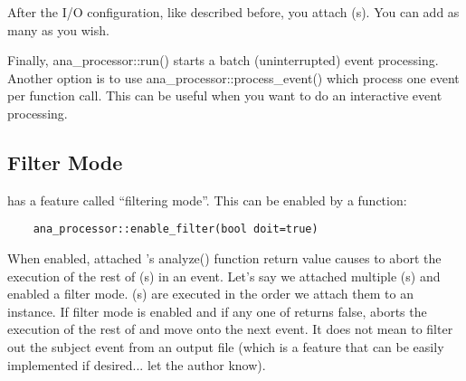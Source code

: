 After the I/O configuration, like described before, you attach \anaunit(s). You can add as many as you wish.

Finally, {\ttfamily ana\_processor::run()} starts a batch (uninterrupted) event processing. Another option is to use {\ttfamily ana\_processor::process\_event()} which process one event per function call. This can be useful when you want to do an interactive event processing.

\subsection{Filter Mode}
\label{sec:analysis:filtermode}
\anaproc has a feature called ``filtering mode''. This can be enabled by a function:
\begin{lstlisting}
    ana_processor::enable_filter(bool doit=true)
\end{lstlisting}
When enabled, attached \anaunit's {\ttfamily analyze()} function return value causes to abort the execution of the rest of \anaunit(s) in an event.
Let's say we attached multiple \anaunit(s) and enabled a filter mode.
\anaunit(s) are executed in the order we attach them to an \anaproc instance.
If filter mode is enabled and if any one of \anaunit returns false, \anaproc aborts the execution of the rest of \anaunit and move onto the next event.
It does not mean to filter out the subject event from an output file (which is a feature that can be easily implemented if desired... let the author know).

